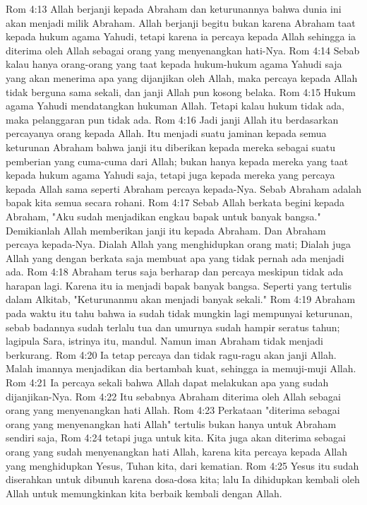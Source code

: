 Rom 4:13  Allah berjanji kepada Abraham dan keturunannya bahwa dunia ini akan menjadi milik Abraham. Allah berjanji begitu bukan karena Abraham taat kepada hukum agama Yahudi, tetapi karena ia percaya kepada Allah sehingga ia diterima oleh Allah sebagai orang yang menyenangkan hati-Nya.
Rom 4:14  Sebab kalau hanya orang-orang yang taat kepada hukum-hukum agama Yahudi saja yang akan menerima apa yang dijanjikan oleh Allah, maka percaya kepada Allah tidak berguna sama sekali, dan janji Allah pun kosong belaka.
Rom 4:15  Hukum agama Yahudi mendatangkan hukuman Allah. Tetapi kalau hukum tidak ada, maka pelanggaran pun tidak ada.
Rom 4:16  Jadi janji Allah itu berdasarkan percayanya orang kepada Allah. Itu menjadi suatu jaminan kepada semua keturunan Abraham bahwa janji itu diberikan kepada mereka sebagai suatu pemberian yang cuma-cuma dari Allah; bukan hanya kepada mereka yang taat kepada hukum agama Yahudi saja, tetapi juga kepada mereka yang percaya kepada Allah sama seperti Abraham percaya kepada-Nya. Sebab Abraham adalah bapak kita semua secara rohani.
Rom 4:17  Sebab Allah berkata begini kepada Abraham, "Aku sudah menjadikan engkau bapak untuk banyak bangsa." Demikianlah Allah memberikan janji itu kepada Abraham. Dan Abraham percaya kepada-Nya. Dialah Allah yang menghidupkan orang mati; Dialah juga Allah yang dengan berkata saja membuat apa yang tidak pernah ada menjadi ada.
Rom 4:18  Abraham terus saja berharap dan percaya meskipun tidak ada harapan lagi. Karena itu ia menjadi bapak banyak bangsa. Seperti yang tertulis dalam Alkitab, "Keturunanmu akan menjadi banyak sekali."
Rom 4:19  Abraham pada waktu itu tahu bahwa ia sudah tidak mungkin lagi mempunyai keturunan, sebab badannya sudah terlalu tua dan umurnya sudah hampir seratus tahun; lagipula Sara, istrinya itu, mandul. Namun iman Abraham tidak menjadi berkurang.
Rom 4:20  Ia tetap percaya dan tidak ragu-ragu akan janji Allah. Malah imannya menjadikan dia bertambah kuat, sehingga ia memuji-muji Allah.
Rom 4:21  Ia percaya sekali bahwa Allah dapat melakukan apa yang sudah dijanjikan-Nya.
Rom 4:22  Itu sebabnya Abraham diterima oleh Allah sebagai orang yang menyenangkan hati Allah.
Rom 4:23  Perkataan "diterima sebagai orang yang menyenangkan hati Allah" tertulis bukan hanya untuk Abraham sendiri saja,
Rom 4:24  tetapi juga untuk kita. Kita juga akan diterima sebagai orang yang sudah menyenangkan hati Allah, karena kita percaya kepada Allah yang menghidupkan Yesus, Tuhan kita, dari kematian.
Rom 4:25  Yesus itu sudah diserahkan untuk dibunuh karena dosa-dosa kita; lalu Ia dihidupkan kembali oleh Allah untuk memungkinkan kita berbaik kembali dengan Allah.
